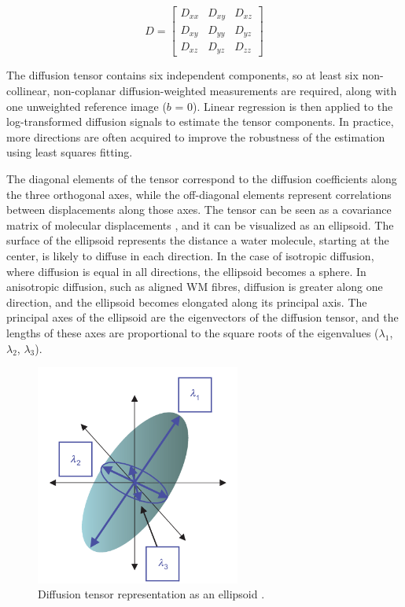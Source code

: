 \[
D =
\begin{bmatrix}
D_{xx} & D_{xy} & D_{xz} \\
D_{xy} & D_{yy} & D_{yz} \\
D_{xz} & D_{yz} & D_{zz}
\end{bmatrix}
\]

The diffusion tensor contains six independent components, so at least six non-collinear, non-coplanar diffusion-weighted measurements are required, along with one unweighted reference image ($b$ = 0). Linear regression is then applied to the log-transformed diffusion signals to estimate the tensor components. In practice, more directions are often acquired to improve the robustness of the estimation using least squares fitting.

The diagonal elements of the tensor correspond to the diffusion coefficients along the three orthogonal axes, while the off-diagonal elements represent correlations between displacements along those axes. The tensor can be seen as a covariance matrix of molecular displacements \cite{Jones2013}, and it can be visualized as an ellipsoid. The surface of the ellipsoid represents the distance a water molecule, starting at the center, is likely to diffuse in each direction.
In the case of isotropic diffusion, where diffusion is equal in all directions, the ellipsoid becomes a sphere. In anisotropic diffusion, such as aligned WM fibres, diffusion is greater along one direction, and the ellipsoid becomes elongated along its principal axis. The principal axes of the ellipsoid are the eigenvectors of the diffusion tensor, and the lengths of these axes are proportional to the square roots of the eigenvalues ($\lambda_1$, $\lambda_2$, $\lambda_3$).

\begin{figure}[h]
  \centering
  \includegraphics[width=0.6\textwidth]{Images/tensor.png} %
  \caption{Diffusion tensor representation as an ellipsoid \cite{Mori20144}.}
  \label{fig:tensor}
\end{figure}

